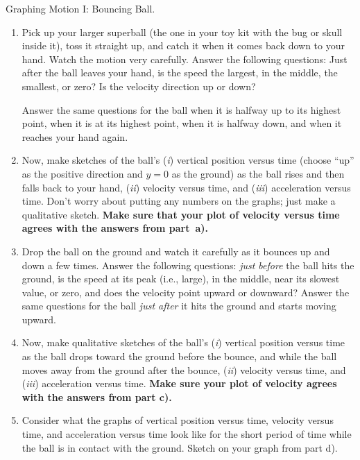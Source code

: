 
\begin{aproblem}{Graphing Motion I:  Bouncing Ball.}
  \begin{enumerate}
  \item Pick up your larger superball (the one in your toy kit with
    the bug or skull inside it), toss it straight up, and catch it
    when it comes back down to your hand.  Watch the motion very
    carefully.  Answer the following questions: Just after the ball
    leaves your hand, is the speed the largest, in the middle, the
    smallest, or zero? Is the velocity direction up or down?

    Answer the same questions for the ball when it is halfway up to
    its highest point, when it is at its highest point, when it is
    halfway down, and when it reaches your hand again.
 
  \item Now, make sketches of the ball's ({\it i}) vertical position versus
    time (choose ``up'' as the positive direction and $y = 0$ as the
    ground) as the ball rises and then falls back to your hand, ({\it ii})
    velocity versus time, and ({\it iii}) acceleration versus time.  Don't
    worry about putting any numbers on the graphs; just make a
    qualitative sketch.  {\bf Make sure that your plot of velocity
      versus time agrees with the answers from part~a).}

  \item Drop the ball on the ground and watch it carefully as it
    bounces up and down a few times.  Answer the following questions:
    {\em just before} the ball hits the ground, is the speed at its
    peak (i.e., large), in the middle, near its slowest value, or
    zero, and does the velocity point upward or downward?  Answer the
    same questions for the ball {\em just after} it hits the ground
    and starts moving upward.

  \item Now, make qualitative sketches of the ball's ({\it i}) vertical
    position versus time as the ball drops toward the ground before
    the bounce, and while the ball moves away from the ground after
    the bounce, ({\it ii}) velocity versus time, and ({\it iii}) acceleration
    versus time.  {\bf Make sure your plot of velocity agrees with the
      answers from part c).}

  \item Consider what the graphs of vertical position versus time,
    velocity versus time, and acceleration versus time look like for
    the short period of time while the ball is in contact with the
    ground.  Sketch on your graph from part d).
 
  \end{enumerate}
  \label{prob:bouncing_ball}
\end{aproblem}

